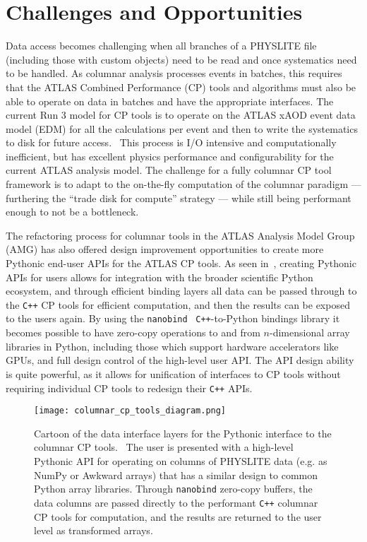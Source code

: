 \section{Challenges and Opportunities}\label{sec:challenges}

Data access becomes challenging when all branches of a PHYSLITE file (including those with custom objects) need to be read and once systematics need to be handled.
As columnar analysis processes events in batches, this requires that the ATLAS Combined Performance (CP) tools and algorithms must also be able to operate on data in batches and have the appropriate interfaces.
The current Run 3 model for CP tools is to operate on the ATLAS xAOD event data model (EDM) for all the calculations per event and then to write the systematics to disk for future access.~\cite{SOFT-2022-02}
This process is I/O intensive and computationally inefficient, but has excellent physics performance and configurability for the current ATLAS analysis model.
The challenge for a fully columnar CP tool framework is to adapt to the on-the-fly computation of the columnar paradigm --- furthering the ``trade disk for compute'' strategy --- while still being performant enough to not be a bottleneck.

The refactoring process for columnar tools in the ATLAS Analysis Model Group (AMG) has also offered design improvement opportunities to create more Pythonic end-user APIs for the ATLAS CP tools.
As seen in~, creating Pythonic APIs for users allows for integration with the broader scientific Python ecosystem, and through efficient binding layers all data can be passed through to the \texttt{C++} CP tools for efficient computation, and then the results can be exposed to the users again.
By using the \texttt{nanobind}~\cite{nanobind} \texttt{C++}-to-Python bindings library it becomes possible to have zero-copy operations to and from $n$-dimensional array libraries in Python, including those which support hardware accelerators like GPUs, and full design control of the high-level user API.
The API design ability is quite powerful, as it allows for unification of interfaces to CP tools without requiring individual CP tools to redesign their \texttt{C++} APIs.

\begin{figure}
    \centering
    \texttt{[image: columnar\_cp\_tools\_diagram.png]}
    \caption{Cartoon of the data interface layers for the Pythonic interface to the columnar CP tools.~\cite{Vigl:ACAT_2024}
The user is presented with a high-level Pythonic API for operating on columns of PHYSLITE data (e.g. as NumPy or Awkward arrays) that has a similar design to common Python array libraries.
Through \texttt{nanobind} zero-copy buffers, the data columns are passed directly to the performant \texttt{C++} columnar CP tools for computation, and the results are returned to the user level as transformed arrays.}
    \label{fig:columnar_cp_tools_diagram}
\end{figure}
